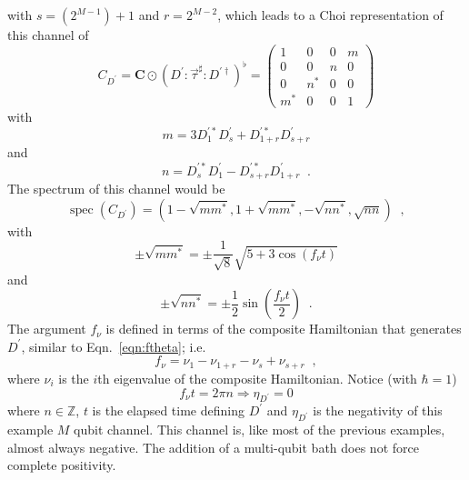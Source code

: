 with $s=(2^{M-1})+1$ and $r=2^{M-2}$, which leads to a Choi representation of this channel of
\begin{equation}
\label{eqn:choiIII}
C_{D^\prime} = \mathbf{C}\odot\left(D^\prime :\vec{\tau}^\sharp : D^{\prime\dagger}\right)^\flat = \begin{pmatrix}
1&0&0&m\\
0&0&n&0\\
0&n^*&0&0\\
m^*&0&0&1
\end{pmatrix}
\end{equation}
with
$$
m = 3D^{\prime *}_1 D^{\prime}_s+D^{\prime *}_{1+r}D^{\prime}_{s+r}
$$
and
$$
n = D^{\prime *}_s D^{\prime}_1-D^{\prime *}_{s+r}D^{\prime}_{1+r}\;\;.
$$
The spectrum of this channel would be
$$
\operatorname{spec}\left(C_{D^\prime}\right)=\left(1-\sqrt{mm^*},1+\sqrt{mm^*},-\sqrt{nn^*},\sqrt{nn}\right)\;\;,
$$
with
$$
\pm \sqrt{mm^*} = \pm \frac{1}{\sqrt{8}}\sqrt{5+3\cos(f_\nu t)}
$$
and
$$
\pm \sqrt{nn^*} = \pm\frac{1}{2} \sin\left(\frac{f_\nu t}{2}\right)\;\;.
$$
The argument $f_\nu$ is defined in terms of the composite Hamiltonian that generates $D^\prime$, similar to Eqn.\ \ref{eqn:ftheta}; i.e.\
$$
f_\nu = \nu_1-\nu_{1+r}-\nu_s+\nu_{s+r}\;\;,
$$
where $\nu_i$ is the $i$th eigenvalue of the composite Hamiltonian.  Notice (with $\hbar=1$)
$$
f_\nu t = 2\pi n\Rightarrow \eta_{D^\prime} = 0
$$
where $n\in\mathbb{Z}$, $t$ is the elapsed time defining $D^\prime$ and $\eta_{D^\prime}$ is the negativity of this example $M$ qubit channel.  This channel is, like most of the previous examples, almost always negative.  The addition of a multi-qubit bath does not force complete positivity.  


